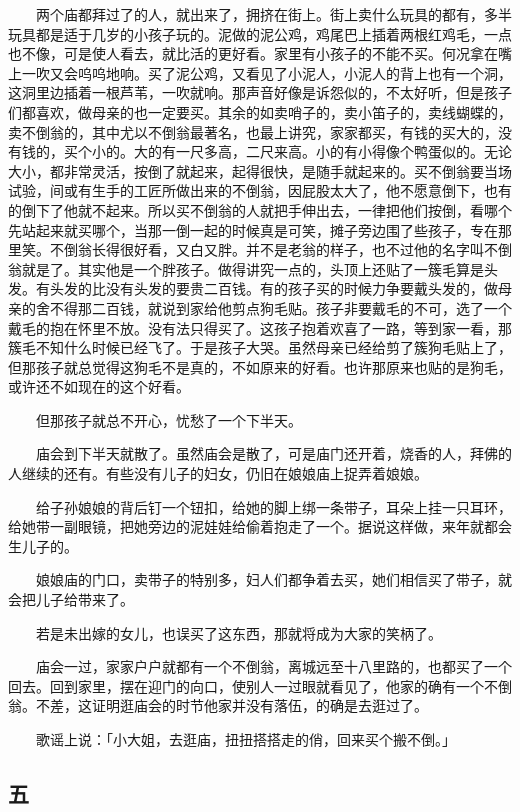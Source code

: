 \documentclass[UTF8]{ctexart}
\begin{document}
　　两个庙都拜过了的人，就出来了，拥挤在街上。街上卖什么玩具的都有，多半玩具都是适于几岁的小孩子玩的。泥做的泥公鸡，鸡尾巴上插着两根红鸡毛，一点也不像，可是使人看去，就比活的更好看。家里有小孩子的不能不买。何况拿在嘴上一吹又会呜呜地响。买了泥公鸡，又看见了小泥人，小泥人的背上也有一个洞，这洞里边插着一根芦苇，一吹就响。那声音好像是诉怨似的，不太好听，但是孩子们都喜欢，做母亲的也一定要买。其余的如卖哨子的，卖小笛子的，卖线蝴蝶的，卖不倒翁的，其中尤以不倒翁最著名，也最上讲究，家家都买，有钱的买大的，没有钱的，买个小的。大的有一尺多高，二尺来高。小的有小得像个鸭蛋似的。无论大小，都非常灵活，按倒了就起来，起得很快，是随手就起来的。买不倒翁要当场试验，间或有生手的工匠所做出来的不倒翁，因屁股太大了，他不愿意倒下，也有的倒下了他就不起来。所以买不倒翁的人就把手伸出去，一律把他们按倒，看哪个先站起来就买哪个，当那一倒一起的时候真是可笑，摊子旁边围了些孩子，专在那里笑。不倒翁长得很好看，又白又胖。并不是老翁的样子，也不过他的名字叫不倒翁就是了。其实他是一个胖孩子。做得讲究一点的，头顶上还贴了一簇毛算是头发。有头发的比没有头发的要贵二百钱。有的孩子买的时候力争要戴头发的，做母亲的舍不得那二百钱，就说到家给他剪点狗毛贴。孩子非要戴毛的不可，选了一个戴毛的抱在怀里不放。没有法只得买了。这孩子抱着欢喜了一路，等到家一看，那簇毛不知什么时候已经飞了。于是孩子大哭。虽然母亲已经给剪了簇狗毛贴上了，但那孩子就总觉得这狗毛不是真的，不如原来的好看。也许那原来也贴的是狗毛，或许还不如现在的这个好看。

　　但那孩子就总不开心，忧愁了一个下半天。

　　庙会到下半天就散了。虽然庙会是散了，可是庙门还开着，烧香的人，拜佛的人继续的还有。有些没有儿子的妇女，仍旧在娘娘庙上捉弄着娘娘。

　　给子孙娘娘的背后钉一个钮扣，给她的脚上绑一条带子，耳朵上挂一只耳环，给她带一副眼镜，把她旁边的泥娃娃给偷着抱走了一个。据说这样做，来年就都会生儿子的。

　　娘娘庙的门口，卖带子的特别多，妇人们都争着去买，她们相信买了带子，就会把儿子给带来了。

　　若是未出嫁的女儿，也误买了这东西，那就将成为大家的笑柄了。

　　庙会一过，家家户户就都有一个不倒翁，离城远至十八里路的，也都买了一个回去。回到家里，摆在迎门的向口，使别人一过眼就看见了，他家的确有一个不倒翁。不差，这证明逛庙会的时节他家并没有落伍，的确是去逛过了。

　　歌谣上说：「小大姐，去逛庙，扭扭搭搭走的俏，回来买个搬不倒。」

\subsection{五}
\end{document}
